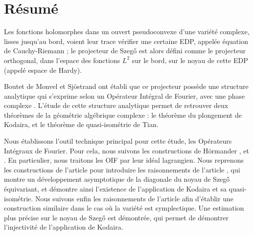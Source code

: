 

\begingroup
\let\clearpage\relax
\let\cleardoublepage\relax
\let\cleardoublepage\relax

\chapter*{Résumé}
	Les fonctions holomorphes dans un ouvert pseudoconvexe d'une variété complexe, lisses jusqu'au bord, voient leur trace vérifier une certaine EDP, appelée équation de Cauchy-Riemann ; le projecteur de Szeg\H{o} est alors  défini comme le projecteur orthogonal, dans l'espace des fonctions $L^2$ sur
	le bord, sur le noyau de cette EDP (appelé espace de Hardy).
	
	Boutet de Monvel et Sjöstrand ont établi que ce projecteur possède une structure analytique qui s'exprime selon un Opérateur Intégral de Fourier, avec une phase complexe \cite{BoutetdeMonvel1975}. L'étude de cette structure analytique permet de retrouver deux théorèmes de la géométrie algébrique complexe : le théorème du plongement de Kodaira, et le théorème de quasi-isométrie de Tian.
	
	Nous établissons l'outil technique principal pour cette étude, les Opérateurs Intégraux de Fourier. Pour cela, nous suivons les constructions de H\"ormander \cite{hormander2003analysis}, \cite{hormander2007} et \cite{hormander1985}. En particulier, nous traitons les OIF par leur idéal lagrangien. Nous reprenons les constructions de l'article \cite{BoutetdeMonvel1975} pour introduire les raisonnements de l'article \cite{Zelditch2000}, qui montre un développement asymptotique de la diagonale du noyau de Szeg\H{o} équivariant, et démontre ainsi l'existence de l'application de Kodaira et sa quasi-isométrie. Nous suivons enfin les raisonnements de l'article \cite{Shiffman2002} afin d'établir une construction similaire dans le cas où la variété est symplectique. Une estimation plus précise sur le noyau de Szeg\H{o} est démontrée, qui permet de démontrer l'injectivité de l'application de Kodaira.
\endgroup			

\vfill
